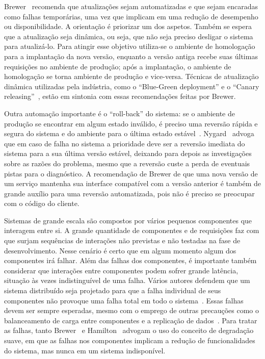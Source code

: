 Brewer~\cite{Brewer2001GiantScale} recomenda que atualizações sejam automatizadas e que sejam encaradas como falhas temporárias, uma vez que implicam em uma redução de desempenho ou disponibilidade. A orientação é priorizar um dos aspetos. Também se espera que a atualização seja dinâmica, ou seja, que não seja preciso desligar o sistema para atualizá-lo. Para atingir esse objetivo utiliza-se o ambiente de homologação para a implantação da nova versão, enquanto a versão antiga recebe suas últimas requisições no ambiente de produção; após a implantação, o ambiente de homologação se torna ambiente de produção e vice-versa. Técnicas de atualização dinâmica utilizadas pela indústria, como o ``Blue-Green deployment'' e o ``Canary releasing''~\cite{Humble2011Continuous}, estão em sintonia com essas recomendações feitas por Brewer.

Outra automação importante é o ``roll-back'' do sistema: se o ambiente de produção se encontrar em algum estado inválido, é preciso uma reversão rápida e segura do sistema e do ambiente para o última estado estável~\cite{Hamilton2007InternetScale, Brewer2001GiantScale}. Nygard~\cite{Nygard2009Release} advoga que em caso de falha no sistema a prioridade deve ser a reversão imediata do sistema para a sua última versão estável, deixando para depois as investigações sobre as razões do problema, mesmo que a reversão custe a perda de eventuais pistas para o diagnóstico. A recomendação de Brewer de que uma nova versão de um serviço mantenha sua interface compatível com a versão anterior é também de grande auxílio para uma reversão automatizada, pois não é preciso se preocupar com o código do cliente.

Sistemas de grande escala são compostos por vários pequenos componentes que interagem entre si. A grande quantidade de componentes e de requisições faz com que surjam sequências de interações não previstas e não testadas na fase de desenvolvimento. Nesse cenário é certo que em algum momento algum dos componentes irá falhar. Além das falhas dos componentes, é importante também considerar que interações entre componentes podem sofrer grande latência, situação às vezes indistinguível de uma falha. Vários autores defendem que um sistema distribuído seja projetado para que a falha individual de seus componentes não provoque uma falha total em todo o sistema~\cite{Hamilton2007InternetScale, Helland2009Quicksand, Nygard2009Release, CarnegieMellon2006ULS}. Essas falhas devem ser sempre esperadas, mesmo com o emprego de outras precauções como o balanceamento de carga entre componentes e a replicação de dados~\cite{Brewer2001GiantScale}. Para tratar as falhas, tanto Brewer~\cite{Brewer2001GiantScale} e Hamilton~\cite{Hamilton2007InternetScale} advogam o uso do conceito de \emph{}degradação suave\emph{}, em que as falhas nos componentes implicam a redução de funcionalidades do sistema, mas nunca em um sistema indisponível.

